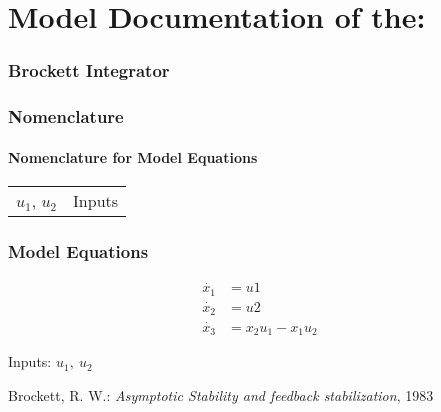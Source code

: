 \documentclass[10pt,a4paper]{article}
\begin{document}
	\part*{Model Documentation of the:}
	\section*{Brockett Integrator} %
	
	
	\section{Nomenclature} %
	\subsection{Nomenclature for Model Equations} %
	
	\begin{tabular}{ll}
		$u_1$, $u_2$ & Inputs		
	\end{tabular}

	
	\section{Model Equations} %
	
	\begin{subequations}
	\begin{align}
		\dot{x_1} &= u1 	\\      %
		\dot{x_2} &= u2 \\
		\dot{x_3} &= x_2 u_1 - x_1 u_2
	\end{align}
	\end{subequations}


	Inputs: $u_1,~u_2$ 
	\\
	
	
	\begin{thebibliography}{10}		
		Brockett, R. W.: 
		\textit{Asymptotic Stability and feedback stabilization}, 1983
	\end{thebibliography}
\end{document}
